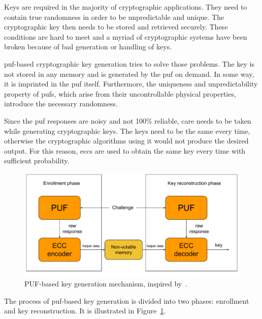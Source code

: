 Keys are required in the majority of cryptographic applications. They need to contain true randomness in order to be unpredictable and unique. The cryptographic key then needs to be stored and retrieved securely. These conditions are hard to meet and a myriad of cryptographic systems have been broken because of bad generation or handling of keys.\cite{Maes2012_2}

\gls{puf}-based cryptographic key generation tries to solve those problems. The key is not stored in any memory and is generated by the \gls{puf} on demand. In some way, it is imprinted in the \gls{puf} itself. Furthermore, the uniqueness and unpredictability property of \glspl{puf}, which arise from their uncontrollable physical properties, introduce the necessary randomness.

Since the \gls{puf} responses are noisy and not 100\% reliable, care needs to be taken while generating cryptographic keys. The keys need to be the same every time, otherwise the cryptographic algorithms using it would not produce the desired output. For this reason, \glspl{ecc} are used to obtain the same key every time with sufficient probability.

\begin{figure}[h!]
    \centering
    \captionsetup{justification=centering,margin=0.5cm}
    \includegraphics[width=\textwidth]{images/key_generation.pdf}
    \caption[PUF-based key generation mechanism.]{PUF-based key generation mechanism, inspired by~\cite{Gao2017}.}
    \label{fig:key_generation}
\end{figure}

The process of \gls{puf}-based key generation is divided into two phases: enrollment and key reconstruction\cite{Mispan2018}. It is illustrated in Figure~\ref{fig:key_generation}.

